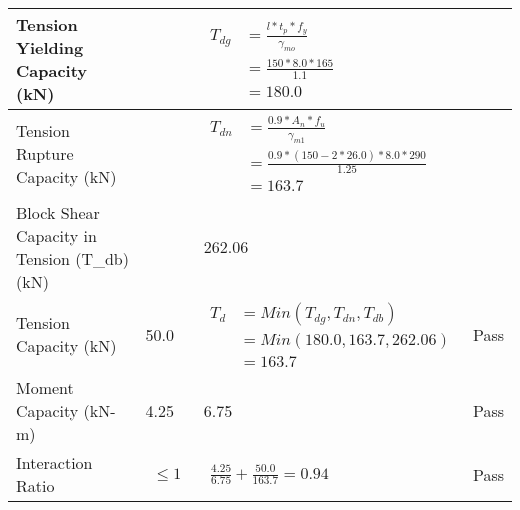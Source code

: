 \documentclass{article}%
\begin{document}
\begin{longtable}{|p{4cm}|p{5cm}|p{5.5cm}|p{1.5cm}|}
\hline%
Tension Yielding Capacity (kN)&&$\begin{aligned} T_{dg} &= \frac{l*t_p*f_y}{\gamma_{mo}}\\ &=\frac{150*8.0*165}{1.1}\\ &=180.0\end{aligned}$&\\%
\hline%
Tension Rupture Capacity (kN)&&$\begin{aligned} T_{dn} &= \frac{0.9*A_{n}*f_u}{\gamma_{m1}}\\ &=\frac{0.9*(150-2*26.0)*8.0*290}{1.25}\\ &=163.7\end{aligned}$&\\%
\hline%
Block Shear Capacity in Tension (T\_db) (kN)&&262.06&\\%
\hline%
Tension Capacity (kN)&50.0&$\begin{aligned} T_d &= Min(T_{dg},T_{dn},T_{db})\\ &= Min(180.0,163.7,262.06)\\ &=163.7\end{aligned}$&Pass\\%
\hline%
Moment Capacity (kN{-}m)&4.25&6.75&Pass\\%
\hline%
Interaction Ratio&$\begin{aligned} \leq1\end{aligned}$&$\begin{aligned} \frac{4.25}{6.75}+\frac{50.0}{163.7}=0.94\end{aligned}$&Pass\\%
\hline%
\end{longtable}

%
\newpage%
\end{document}
